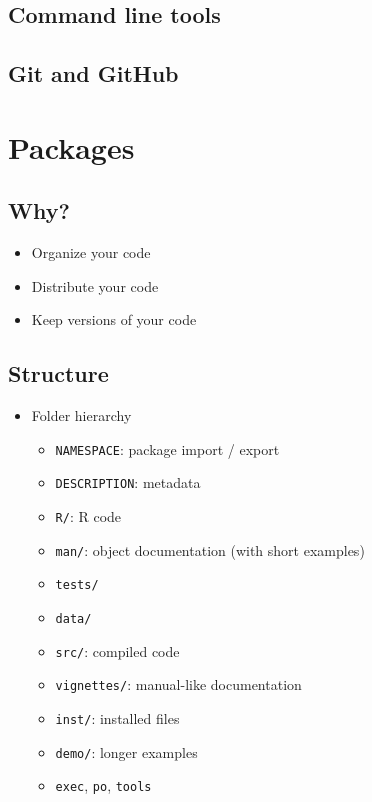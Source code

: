 \documentclass[]{book}
\providecommand{\tightlist}{%
  \setlength{\itemsep}{0pt}\setlength{\parskip}{0pt}}
\theoremstyle{definition}
\theoremstyle{definition}
\theoremstyle{definition}
\theoremstyle{remark}
\begin{document}
\section{Command line tools}\label{command-line-tools}

\section{Git and GitHub}\label{git-and-github}

\chapter{Packages}\label{packages}

\section{Why?}\label{why}

\begin{itemize}
\item
  Organize your code
\item
  Distribute your code
\item
  Keep versions of your code
\end{itemize}

\section{Structure}\label{structure}

\begin{itemize}
\tightlist
\item
  Folder hierarchy

  \begin{itemize}
  \tightlist
  \item
    \texttt{NAMESPACE}: package import / export
  \item
    \texttt{DESCRIPTION}: metadata
  \item
    \texttt{R/}: R code
  \item
    \texttt{man/}: object documentation (with short examples)
  \item
    \texttt{tests/}
  \item
    \texttt{data/}
  \item
    \texttt{src/}: compiled code
  \item
    \texttt{vignettes/}: manual-like documentation
  \item
    \texttt{inst/}: installed files
  \item
    \texttt{demo/}: longer examples
  \item
    \texttt{exec}, \texttt{po}, \texttt{tools}
  \end{itemize}
\end{itemize}
\end{document}
